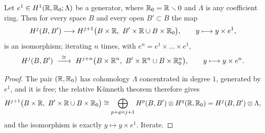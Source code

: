 \begin{lemma}\label{lem:suspension}
Let $e^1\in H^1(\mathbb{R},\mathbb{R}_0;\Lambda)$ be a generator, where $\mathbb{R}_0=\mathbb{R}\smallsetminus0$
and $\Lambda$ is any coefficient ring. Then for every space $B$ and every open
$B'\subset B$ the map
\[
H^{j}(B,B')\longrightarrow
H^{j+1}\big(B\times\mathbb{R},\ B'\times\mathbb{R}\cup B\times\mathbb{R}_0\big),
\qquad
y\longmapsto y\times e^1,
\]
is an isomorphism; iterating $n$ times, with $e^n=e^1\times\dots\times e^1$,
\[
H^{j}(B,B')\ \xrightarrow{\ \cong\ }\
H^{j+n}\big(B\times\mathbb{R}^n,\ B'\times\mathbb{R}^n\cup B\times\mathbb{R}^n_0\big),
\qquad y\longmapsto y\times e^n .
\]
\end{lemma}

\begin{proof}
The pair $(\mathbb{R},\mathbb{R}_0)$ has cohomology $\Lambda$ concentrated in degree $1$,
generated by $e^1$, and it is free; the relative K\"unneth theorem therefore
gives
\[
H^{j+1}\big(B\times\mathbb{R},\ B'\times\mathbb{R}\cup B\times\mathbb{R}_0\big)
\cong\bigoplus_{p+q=j+1}H^p(B,B')\otimes H^q(\mathbb{R},\mathbb{R}_0)
=H^{j}(B,B')\otimes\Lambda ,
\]
and the isomorphism is exactly $y\mapsto y\times e^1$. Iterate.
\end{proof}

